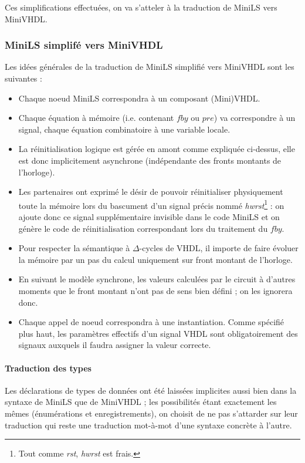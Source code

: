 \documentclass[9pt,a4paper]{article}
\begin{document}
Ces simplifications effectuées, on va s'atteler à la traduction de MiniLS vers
MiniVHDL.

\subsubsection{MiniLS simplifé vers MiniVHDL}

Les idées générales de la traduction de MiniLS simplifié vers MiniVHDL sont les
suivantes :

\begin{itemize}
\item Chaque noeud MiniLS correspondra à un composant (Mini)VHDL.
\item Chaque équation à mémoire (i.e. contenant $fby$ ou $pre$) va correspondre
  à un signal, chaque équation combinatoire à une variable locale.
\item La réinitialisation logique est gérée en amont comme expliquée ci-dessus,
  elle est donc implicitement asynchrone (indépendante des fronts montants de
  l'horloge).
\item Les partenaires ont exprimé le désir de pouvoir réinitialiser physiquement
  toute la mémoire lors du bascument d'un signal précis nommé
  \textit{hwrst}\footnote{Tout comme \textit{rst}, \textit{hwrst} est frais.} :
  on ajoute donc ce signal supplémentaire invisible dans le code MiniLS et on
  génère le code de réinitialisation correspondant lors du traitement du $fby$.
\item Pour respecter la sémantique à $\Delta$-cycles de VHDL, il importe de
  faire évoluer la mémoire par un pas du calcul uniquement sur front montant de
  l'horloge.
\item En suivant le modèle synchrone, les valeurs calculées par le circuit à
  d'autres moments que le front montant n'ont pas de sens bien défini ; on les
  ignorera donc.
\item Chaque appel de noeud correspondra à une instantiation. Comme spécifié
  plus haut, les paramètres effectifs d'un signal VHDL sont obligatoirement des
  signaux auxquels il faudra assigner la valeur correcte.
\end{itemize}

\paragraph{Traduction des types}

Les déclarations de types de données ont été laissées implicites aussi bien dans
la syntaxe de MiniLS que de MiniVHDL ; les possibilités étant exactement les
mêmes (énumérations et enregistrements), on choisit de ne pas s'attarder sur
leur traduction qui reste une traduction mot-à-mot d'une syntaxe concrète à
l'autre.
\end{document}
